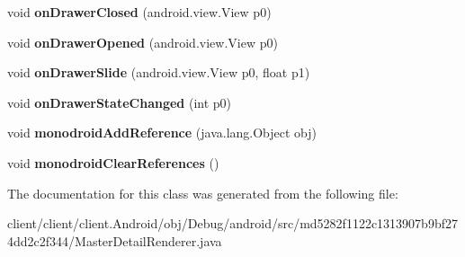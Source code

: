 \begin{DoxyCompactItemize}
\item 
\hypertarget{classmd5282f1122c1313907b9bf274dd2c2f344_1_1MasterDetailRenderer_a9ac1cd1f7ca3b049c9a76c0ce0abb867}{}void {\bfseries on\+Drawer\+Closed} (android.\+view.\+View p0)\label{classmd5282f1122c1313907b9bf274dd2c2f344_1_1MasterDetailRenderer_a9ac1cd1f7ca3b049c9a76c0ce0abb867}

\item 
\hypertarget{classmd5282f1122c1313907b9bf274dd2c2f344_1_1MasterDetailRenderer_a571c43ad4d90ff15e82c3ba7ed40b3a6}{}void {\bfseries on\+Drawer\+Opened} (android.\+view.\+View p0)\label{classmd5282f1122c1313907b9bf274dd2c2f344_1_1MasterDetailRenderer_a571c43ad4d90ff15e82c3ba7ed40b3a6}

\item 
\hypertarget{classmd5282f1122c1313907b9bf274dd2c2f344_1_1MasterDetailRenderer_ae8bc8a5dbd525abf596397d5ca8b11b8}{}void {\bfseries on\+Drawer\+Slide} (android.\+view.\+View p0, float p1)\label{classmd5282f1122c1313907b9bf274dd2c2f344_1_1MasterDetailRenderer_ae8bc8a5dbd525abf596397d5ca8b11b8}

\item 
\hypertarget{classmd5282f1122c1313907b9bf274dd2c2f344_1_1MasterDetailRenderer_a79e1137cdb45bccf076db887c1eaf2f9}{}void {\bfseries on\+Drawer\+State\+Changed} (int p0)\label{classmd5282f1122c1313907b9bf274dd2c2f344_1_1MasterDetailRenderer_a79e1137cdb45bccf076db887c1eaf2f9}

\item 
\hypertarget{classmd5282f1122c1313907b9bf274dd2c2f344_1_1MasterDetailRenderer_a8b696ef7f0bdc6712c2331235be821b3}{}void {\bfseries monodroid\+Add\+Reference} (java.\+lang.\+Object obj)\label{classmd5282f1122c1313907b9bf274dd2c2f344_1_1MasterDetailRenderer_a8b696ef7f0bdc6712c2331235be821b3}

\item 
\hypertarget{classmd5282f1122c1313907b9bf274dd2c2f344_1_1MasterDetailRenderer_a6a39c5138a385408b8c8a37fb65f809b}{}void {\bfseries monodroid\+Clear\+References} ()\label{classmd5282f1122c1313907b9bf274dd2c2f344_1_1MasterDetailRenderer_a6a39c5138a385408b8c8a37fb65f809b}

\end{DoxyCompactItemize}


The documentation for this class was generated from the following file\+:\begin{DoxyCompactItemize}
\item 
client/client/client.\+Android/obj/\+Debug/android/src/md5282f1122c1313907b9bf274dd2c2f344/Master\+Detail\+Renderer.\+java\end{DoxyCompactItemize}
